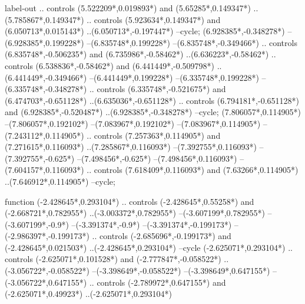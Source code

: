 {\begin{scope}[x=1mm,y=1mm,line width=\SCstroke mm,line cap=round,line join=round]
\begin{SCpart}{label-out}
.. controls ({5.522209*\SCF},{0.019893*\SCF}) and ({5.65285*\SCF},{0.149347*\SCF}) ..({5.785867*\SCF},{0.149347*\SCF})
.. controls ({5.923634*\SCF},{0.149347*\SCF}) and ({6.050713*\SCF},{0.015143*\SCF}) ..({6.050713*\SCF},{-0.197447*\SCF})
--cycle;
 ({6.928385*\SCF},{-0.348278*\SCF})
--({6.928385*\SCF},{0.199228*\SCF})
--({6.835748*\SCF},{0.199228*\SCF})
--({6.835748*\SCF},{-0.349466*\SCF})
.. controls ({6.835748*\SCF},{-0.506235*\SCF}) and ({6.735986*\SCF},{-0.58462*\SCF}) ..({6.636223*\SCF},{-0.58462*\SCF})
.. controls ({6.538836*\SCF},{-0.58462*\SCF}) and ({6.441449*\SCF},{-0.509798*\SCF}) ..({6.441449*\SCF},{-0.349466*\SCF})
--({6.441449*\SCF},{0.199228*\SCF})
--({6.335748*\SCF},{0.199228*\SCF})
--({6.335748*\SCF},{-0.348278*\SCF})
.. controls ({6.335748*\SCF},{-0.521675*\SCF}) and ({6.474703*\SCF},{-0.651128*\SCF}) ..({6.635036*\SCF},{-0.651128*\SCF})
.. controls ({6.794181*\SCF},{-0.651128*\SCF}) and ({6.928385*\SCF},{-0.520487*\SCF}) ..({6.928385*\SCF},{-0.348278*\SCF})
--cycle;
 ({7.806057*\SCF},{0.114905*\SCF})
--({7.806057*\SCF},{0.192102*\SCF})
--({7.083967*\SCF},{0.192102*\SCF})
--({7.083967*\SCF},{0.114905*\SCF})
--({7.243112*\SCF},{0.114905*\SCF})
.. controls ({7.257363*\SCF},{0.114905*\SCF}) and ({7.271615*\SCF},{0.116093*\SCF}) ..({7.285867*\SCF},{0.116093*\SCF})
--({7.392755*\SCF},{0.116093*\SCF})
--({7.392755*\SCF},{-0.625*\SCF})
--({7.498456*\SCF},{-0.625*\SCF})
--({7.498456*\SCF},{0.116093*\SCF})
--({7.604157*\SCF},{0.116093*\SCF})
.. controls ({7.618409*\SCF},{0.116093*\SCF}) and ({7.63266*\SCF},{0.114905*\SCF}) ..({7.646912*\SCF},{0.114905*\SCF})
--cycle;
\end{SCpart}
\begin{SCpart}{function}
 ({-2.428645*\SCF},{0.293104*\SCF})
.. controls ({-2.428645*\SCF},{0.55258*\SCF}) and ({-2.668721*\SCF},{0.782955*\SCF}) ..({-3.003372*\SCF},{0.782955*\SCF})
--({-3.607199*\SCF},{0.782955*\SCF})
--({-3.607199*\SCF},{-0.9*\SCF})
--({-3.391374*\SCF},{-0.9*\SCF})
--({-3.391374*\SCF},{-0.199173*\SCF})
--({-2.986397*\SCF},{-0.199173*\SCF})
.. controls ({-2.685696*\SCF},{-0.199173*\SCF}) and ({-2.428645*\SCF},{0.021503*\SCF}) ..({-2.428645*\SCF},{0.293104*\SCF})
--cycle
({-2.625071*\SCF},{0.293104*\SCF})
.. controls ({-2.625071*\SCF},{0.101528*\SCF}) and ({-2.777847*\SCF},{-0.058522*\SCF}) ..({-3.056722*\SCF},{-0.058522*\SCF})
--({-3.398649*\SCF},{-0.058522*\SCF})
--({-3.398649*\SCF},{0.647155*\SCF})
--({-3.056722*\SCF},{0.647155*\SCF})
.. controls ({-2.789972*\SCF},{0.647155*\SCF}) and ({-2.625071*\SCF},{0.49923*\SCF}) ..({-2.625071*\SCF},{0.293104*\SCF})

\end{SCpart}
\end{scope}}
